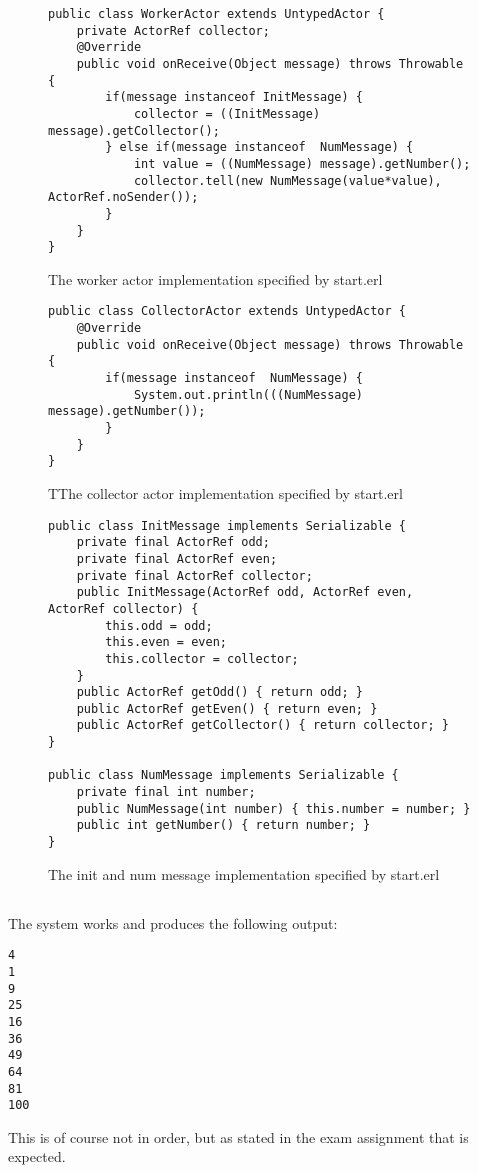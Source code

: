 \begin{figure}
\begin{lstlisting}
public class WorkerActor extends UntypedActor {
    private ActorRef collector;
    @Override
    public void onReceive(Object message) throws Throwable {
        if(message instanceof InitMessage) {
            collector = ((InitMessage) message).getCollector();
        } else if(message instanceof  NumMessage) {
            int value = ((NumMessage) message).getNumber();
            collector.tell(new NumMessage(value*value), ActorRef.noSender());
        }
    }
}
\end{lstlisting}
\caption{The worker actor implementation specified by start.erl}
\label{code:6:1-3}
\end{figure}



\begin{figure}
\begin{lstlisting}
public class CollectorActor extends UntypedActor {
    @Override
    public void onReceive(Object message) throws Throwable {
        if(message instanceof  NumMessage) {
            System.out.println(((NumMessage) message).getNumber());
        }
    }
}
\end{lstlisting}
\caption{TThe collector actor implementation specified by start.erl}
\label{code:6:1-4}
\end{figure}



\begin{figure}
\begin{lstlisting}
public class InitMessage implements Serializable {
    private final ActorRef odd;
    private final ActorRef even;
    private final ActorRef collector;
    public InitMessage(ActorRef odd, ActorRef even, ActorRef collector) {
        this.odd = odd;
        this.even = even;
        this.collector = collector;
    }
    public ActorRef getOdd() { return odd; }
    public ActorRef getEven() { return even; }
    public ActorRef getCollector() { return collector; }
}

public class NumMessage implements Serializable {
    private final int number;
    public NumMessage(int number) { this.number = number; }
    public int getNumber() { return number; }
}
\end{lstlisting}
\caption{The init and num message implementation specified by start.erl}
\label{code:6:1-5}
\end{figure}

\subsection{}
The system works and produces the following output:
\begin{lstlisting}
4
1
9
25
16
36
49
64
81
100
\end{lstlisting}
This is of course not in order, but as stated in the exam assignment that is expected.